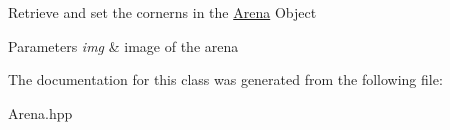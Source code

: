Retrieve and set the cornerns in the \mbox{\hyperlink{class_l_a_r_1_1_arena}{Arena}} Object 
\begin{DoxyParams}{Parameters}
{\em img} & image of the arena \\
\hline
\end{DoxyParams}


The documentation for this class was generated from the following file\+:\begin{DoxyCompactItemize}
\item 
Arena.\+hpp\end{DoxyCompactItemize}
